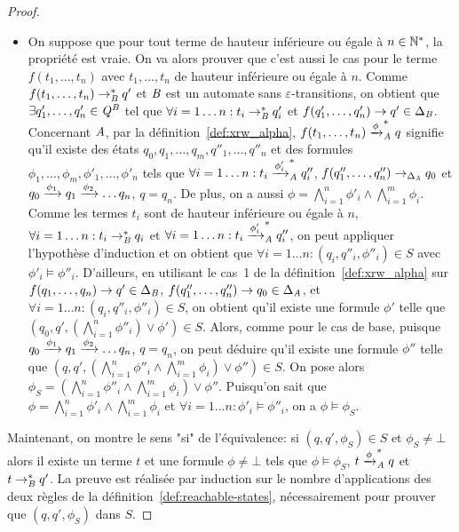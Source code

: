 \begin{proof}
\begin{itemize}
\item On suppose que pour tout terme de hauteur inférieure ou égale à $n\in\mathbb{N}^*$, la propriété
  est vraie. On va alors prouver que c'est aussi le cas pour le terme $f(t_1, \ldots,
  t_n)$ avec $t_1, \ldots, t_n$ de hauteur inférieure ou égale à $n$. Comme $f(t_1,
  \ldots, t_n) \rightarrow^*_\mathit B q'$ et $\mathit B$ est un automate sans $\varepsilon$-transitions, on
  obtient que $\exists q'_1,\ldots,q'_n\in\mathit Q^\mathit B$ tel que $\forall i=1\ldots n:
  t_i \rightarrow^*_\mathit B q'_i$ et $f(q'_1,\ldots,q'_n) \rightarrow q' \in \Delta_\mathit B$. 
  Concernant $\mathit A$, par la définition~\ref{def:xrw_alpha}, $f(t_1, \ldots, t_n)
  \xrightarrow{\phi}^*_\mathit A q$ signifie qu'il existe des états $q_0,q_1, \ldots,
  q_m,q''_1,\ldots,q''_n$ et des formules $\phi_1,\ldots, \phi_m, \phi'_1, \ldots,
  \phi'_n$ tels que $\forall i=1\ldots n: t_i \xrightarrow{\phi'_i}^*_\mathit A q''_i$,
  $f(q''_1,\ldots, q''_n) \rightarrow_{\Delta_\mathit A} q_0$ et $q_0 \xrightarrow{\phi_1} q_1
  \xrightarrow{\phi_2} \ldots q_n$, $q=q_n$. De plus, on a aussi $\phi=
  \bigwedge_{i=1}^{n} \phi'_i \wedge \bigwedge_{i=1}^{m} \phi_i$. %
  Comme les termes $t_i$ sont de hauteur inférieure ou égale à $n$, $\forall
  i=1\ldots n: t_i \rightarrow^*_\mathit B q_i$ et $\forall i=1 \ldots n: t_i \xrightarrow{\phi'_i}_\mathit A^*
  q''_i$, on peut appliquer l'hypothèse d'induction  et on obtient que $\forall
  i=1\ldots n: (q_i, q''_i, \phi''_i) \in S$ avec $\phi'_i \models \phi''_i$. %
  D'ailleurs, en utilisant le cas~1 de la définition~\ref{def:xrw_alpha} sur
  $f(q_1,\ldots,q_n) \rightarrow q' \in \Delta_\mathit B$, $f(q''_1,\ldots,q''_n) \rightarrow q_0 \in
  \Delta_\mathit A$, et $\forall i=1\ldots n: (q_i, q''_i, \phi''_i) \in S$, on obtient
  qu'il existe une formule $\phi'$ telle que $(q_0,q', (\bigwedge_{i=1}^n
  \phi''_i) \vee \phi')\in S$. Alors, comme pour le cas de base, puisque $q_0
  \xrightarrow{\phi_1} q_1 \xrightarrow{\phi_2} \ldots q_n$, $q=q_n$, on peut déduire qu'il
  existe une formule $\phi''$ telle que $(q,q',(\bigwedge_{i=1}^n \phi''_i
  \wedge \bigwedge_{i=1}^{m} \phi_i) \vee \phi'')\in S$. On pose alors $\phi_S= (\bigwedge_{i=1}^n \phi''_i
  \wedge \bigwedge_{i=1}^{m} \phi_i) \vee \phi''$. Puisqu'on sait que $\phi=\bigwedge_{i=1}^n \phi'_i \wedge \bigwedge_{i=1}^{m} \phi_i$
  et $\forall i=1\ldots n: \phi'_i \models \phi''_i$, on a $\phi \models \phi_S$.   %
\end{itemize}


\medskip
Maintenant, on montre le sens "si" de l'équivalence: si $(q,q',\phi_S)\in S$ et $\phi_S \neq \bot$
alors il existe un terme $t$ et une formule $\phi \neq \bot$ tels que $\phi \models \phi_S$,
$t\xrightarrow{\phi}^*_\mathit A q$ et $t \rightarrow_\mathit B^* q'$. La preuve est réalisée par induction sur
le nombre d'applications des deux règles de la définition~\ref{def:reachable-states}, 
nécessairement pour prouver que $(q,q',\phi_S)$ dans $S$.


\end{proof}
